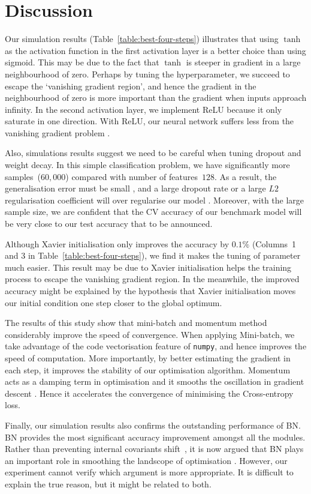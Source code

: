 \section{Discussion}

Our simulation results (Table~\ref{table:best-four-steps}) illustrates that using $\tanh$ as the activation function in the first activation layer is a better choice than using sigmoid. This may be due to the fact that $\tanh$ is steeper in gradient in a large neighbourhood of zero. Perhaps by tuning the hyperparameter, we succeed to escape the `vanishing gradient region', and hence the gradient in the neighbourhood of zero is more important than the gradient when inputs approach infinity. In the second activation layer, we implement ReLU because it only saturate in one direction. With ReLU, our neural network suffers less from the vanishing gradient problem \citep{pmlr-v9-glorot10a}.

Also, simulations results suggest we need to be careful when tuning dropout and weight decay. In this simple classification problem, we have significantly more samples~($60,000$) compared with number of  features~$128$. As a result, the generalisation error must be small \citep{james2013introduction}, and a large dropout rate or a large $L2$ regularisation coefficient will over regularise our model \citep{hastie01statisticallearning}. Moreover, with the large sample size, we are confident that the CV accuracy of our benchmark model will be very close to our test accuracy that to be announced.

Although Xavier initialisation only improves the accuracy by $0.1\%$ (Columns~1 and 3 in Table~\ref{table:best-four-steps}), we find it makes the tuning of parameter much easier. This result may be due to Xavier initialisation helps the training process to escape the vanishing gradient region. In the meanwhile, the improved accuracy might be explained by the hypothesis that Xavier initialisation moves our initial condition one step closer to the global optimum.

The results of this study show that mini-batch and momentum method considerably improve the speed of convergence. When applying Mini-batch, we take advantage of the code vectorisation feature of \texttt{numpy}, and hence improves the speed of computation. More importantly, by better estimating the gradient in each step, it improves the stability of our optimisation algorithm. Momentum acts as a damping term in optimisation and it smooths the oscillation in gradient descent \citep{goh2017why}. Hence it accelerates the convergence of minimising the Cross-entropy loss.

Finally, our simulation results also confirms the outstanding performance of BN. BN provides the most significant accuracy improvement amongst all the modules. Rather than preventing internal covariants shift~\citep{pmlr-v37-ioffe15}, it is now argued that BN plays an important role in smoothing the landscope of optimisation \citep{NIPS20187515}. However, our experiment cannot verify which argument is more appropriate. It is difficult to explain the true reason, but it might be related to both.
